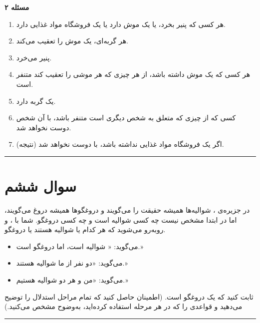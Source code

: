 \documentclass[a4paper,10pt]{article}
\begin{document}
\textbf{مسئله ۲}
\begin{enumerate}
	\item هر کسی که پنیر بخرد، یا یک موش دارد یا یک فروشگاه مواد غذایی دارد.
	\item هر گربه‌ای، یک موش را تعقیب می‌کند.
	\item {} پنیر می‌خرد.
	\item هر کسی که یک موش داشته باشد، از هر چیزی که هر موشی را تعقیب کند متنفر است.
	\item {} یک گربه دارد.
	\item کسی که از چیزی که متعلق به شخص دیگری است متنفر باشد، با آن شخص دوست نخواهد شد.
	\item (نتیجه) اگر  یک فروشگاه مواد غذایی نداشته باشد، با  دوست نخواهد شد.
\end{enumerate}

\bigskip
\bigskip
\textcolor{AccentCyan}{\rule{\linewidth}{0.4pt}}
\section{\textcolor{AccentGold}{سوال ششم}}

در جزیره‌ی ، شوالیه‌ها همیشه حقیقت را می‌گویند و دروغگوها همیشه دروغ می‌گویند، اما در ابتدا مشخص نیست چه کسی شوالیه است و چه کسی دروغگو. شما با ،  و  روبه‌رو می‌شوید که هر کدام یا شوالیه هستند یا دروغگو.

\begin{itemize}
	\item {} می‌گوید: « شوالیه است، اما  دروغگو است.»
	\item {} می‌گوید: «دو نفر از ما شوالیه هستند.»
	\item {} می‌گوید: «من و  هر دو شوالیه هستیم.»
\end{itemize}

ثابت کنید که  یک دروغگو است. (اطمینان حاصل کنید که تمام مراحل استدلال را توضیح می‌دهید و قواعدی را که در هر مرحله استفاده کرده‌اید، به‌وضوح مشخص می‌کنید.)

\bigskip
\bigskip
\textcolor{AccentCyan}{\rule{\linewidth}{0.4pt}}
\end{document}
